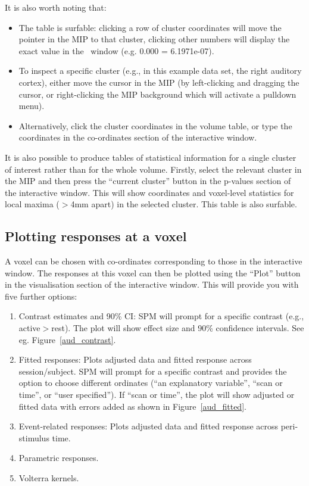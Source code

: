 It is also worth noting that:

\begin{itemize}
\item The table is surfable: clicking a row of cluster coordinates will move the pointer in the MIP to that cluster, clicking other numbers will display the exact value in the \matlab\ window (e.g. 0.000 = 6.1971e-07).
\item To inspect a specific cluster (e.g., in this example data set, the right auditory cortex), either move the cursor in the MIP (by left-clicking and dragging the cursor, or right-clicking the MIP background which will activate a pulldown menu).
\item Alternatively, click the cluster coordinates in the volume table, or type the coordinates in the co-ordinates section of the interactive window.
\end{itemize}

It is also possible to produce tables of statistical information for a single cluster of interest rather than for the whole volume. Firstly, select the relevant cluster in the MIP and then press the ``current cluster'' button in the p-values section of the interactive window. This will show coordinates and voxel-level statistics for local maxima ($>$4mm apart) in the selected cluster. This table is also surfable.

\subsection{Plotting responses at a voxel}

A voxel can be chosen with co-ordinates corresponding to those in the interactive window. The responses at this voxel can then be plotted using the ``Plot'' button in the visualisation section of the interactive window. This will provide you with five further options:

\begin{enumerate}
\item Contrast estimates and 90\% CI: SPM will prompt for a specific contrast (e.g., active$>$rest). The plot will show effect size and 90\% confidence intervals. See eg. Figure~\ref{aud_contrast}.
\item Fitted responses: Plots adjusted data and fitted response across session/subject. SPM will prompt for a specific contrast and provides the option to choose different ordinates (``an explanatory variable'', ``scan or time'', or ``user specified''). If ``scan or time'', the plot will show adjusted or fitted data with errors added as shown in Figure~\ref{aud_fitted}.
\item Event-related responses: Plots adjusted data and fitted response across peri-stimulus time.
\item Parametric responses.
\item Volterra kernels.
\end{enumerate}

